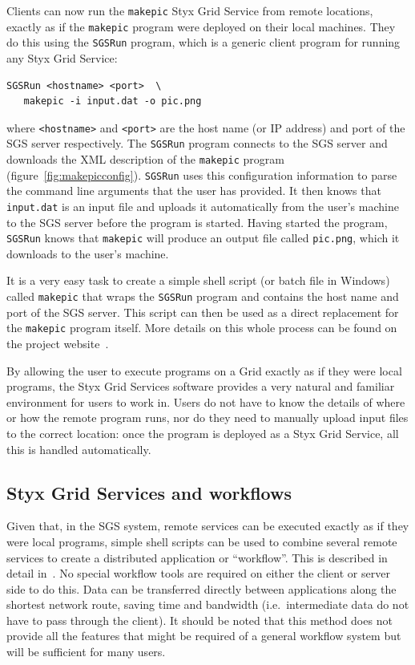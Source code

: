 \documentclass[a4paper]{article}
\begin{document}
\begin{multicols}{2}
Clients can now run the {\tt makepic} Styx Grid Service from remote locations, exactly as if the {\tt makepic} program were deployed on their local machines.  They do this using the {\tt SGSRun} program, which is a generic client program for running any Styx Grid Service:

\begin{verbatim}
SGSRun <hostname> <port>  \
   makepic -i input.dat -o pic.png
\end{verbatim}
where {\tt <hostname>} and {\tt <port>} are the host name (or IP address) and port of the SGS server respectively.  The {\tt SGSRun} program connects to the SGS server and downloads the XML description of the {\tt makepic} program  (figure~\ref{fig:makepicconfig}).  {\tt SGSRun} uses this configuration information to parse the command line arguments that the user has provided.  It then knows that {\tt input.dat} is an input file and uploads it automatically from the user's machine to the SGS server before the program is started.  Having started the program, {\tt SGSRun} knows that {\tt makepic} will produce an output file called {\tt pic.png}, which it downloads to the user's machine.

It is a very easy task to create a simple shell script (or batch file in Windows) called {\tt makepic} that wraps the {\tt SGSRun} program and contains the host name and port of the SGS server.  This script can then be used as a direct replacement for the {\tt makepic} program itself.  More details on this whole process can be found on the project website~\cite{sgswebsite}.

By allowing the user to execute programs on a Grid exactly as if they were local programs, the Styx Grid Services software provides a very natural and familiar environment for users to work in.  Users do not have to know the details of where or how the remote program runs, nor do they need to manually upload input files to the correct location: once the program is deployed as a Styx Grid Service, all this is handled automatically.

\subsection{Styx Grid Services and workflows}
Given that, in the SGS system, remote services can be executed exactly as if they were local programs, simple shell scripts can be used to combine several remote services to create a distributed application or ``workflow''.  This is described in detail in~\cite{blower:2006}.  No special workflow tools are required on either the client or server side to do this.  Data can be transferred directly between applications along the shortest network route, saving time and bandwidth (i.e.\ intermediate data do not have to pass through the client).  It should be noted that this method does not provide all the features that might be required of a general workflow system but will be sufficient for many users.


\end{multicols}
\end{document}
